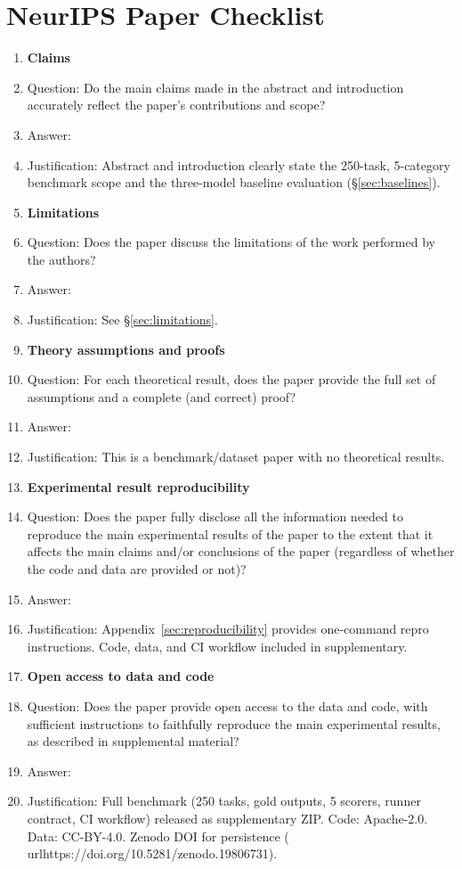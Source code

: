 \section*{NeurIPS Paper Checklist}

\begin{enumerate}

\item {\bf Claims}
    \item[] Question: Do the main claims made in the abstract and introduction accurately reflect the paper's contributions and scope?
    \item[] Answer: \answerYes{}
    \item[] Justification: Abstract and introduction clearly state the 250-task, 5-category benchmark scope and the three-model baseline evaluation (\S\ref{sec:baselines}).

\item {\bf Limitations}
    \item[] Question: Does the paper discuss the limitations of the work performed by the authors?
    \item[] Answer: \answerYes{}
    \item[] Justification: See \S\ref{sec:limitations}.

\item {\bf Theory assumptions and proofs}
    \item[] Question: For each theoretical result, does the paper provide the full set of assumptions and a complete (and correct) proof?
    \item[] Answer: \answerNA{}
    \item[] Justification: This is a benchmark/dataset paper with no theoretical results.

\item {\bf Experimental result reproducibility}
    \item[] Question: Does the paper fully disclose all the information needed to reproduce the main experimental results of the paper to the extent that it affects the main claims and/or conclusions of the paper (regardless of whether the code and data are provided or not)?
    \item[] Answer: \answerYes{}
    \item[] Justification: Appendix~\ref{sec:reproducibility} provides one-command repro instructions. Code, data, and CI workflow included in supplementary.

\item {\bf Open access to data and code}
    \item[] Question: Does the paper provide open access to the data and code, with sufficient instructions to faithfully reproduce the main experimental results, as described in supplemental material?
    \item[] Answer: \answerYes{}
    \item[] Justification: Full benchmark (250 tasks, gold outputs, 5 scorers, runner contract, CI workflow) released as supplementary ZIP. Code: Apache-2.0. Data: CC-BY-4.0. Zenodo DOI for persistence (\\url{https://doi.org/10.5281/zenodo.19806731}).


\end{enumerate}
